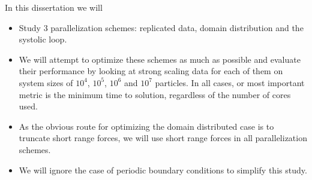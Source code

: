 In this dissertation we will
\begin{itemize}
\item
    Study 3 parallelization schemes: replicated data, domain distribution
    and the systolic loop.

\item
    We will attempt to optimize these schemes as much as possible
    and evaluate their performance by looking at strong scaling
    data for each of them on system sizes of $10^4$, $10^5$, $10^6$ and
    $10^7$ particles. In all cases, or most important metric is the minimum
    time to solution, regardless of the number of cores used.

\item
    As the obvious route for optimizing the domain distributed case is to
    truncate short range forces, we will use short range forces in all
    parallelization schemes.

\item
    We will ignore the case of periodic boundary conditions to
    simplify this study.
\end  {itemize}
